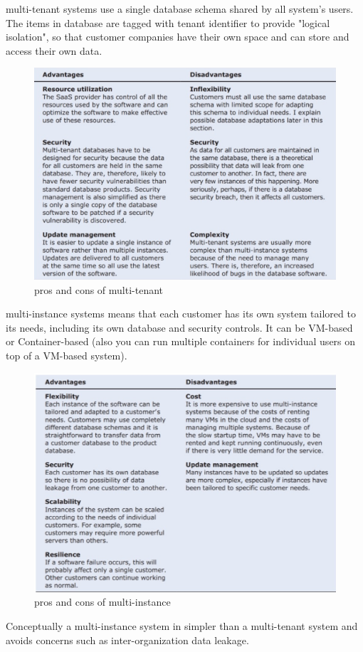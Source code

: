 multi-tenant systems use a single database schema shared by all system's users. The items in database are tagged with tenant identifier to provide "logical isolation", so that customer companies have their
own space and can store and access their own data.
\begin{figure}[ht]
   \centering
   \includegraphics[width=0.5\linewidth]{images/questions/multi-tenant.png}
   \caption{pros and cons of multi-tenant}
   \label{fig:multi-tenant}
\end{figure}
multi-instance systems means that each customer has its own system tailored to its needs, including its own database and security controls. It can be VM-based or Container-based (also you can run multiple containers for individual users on top of a VM-based system).
\begin{figure}[ht]
   \centering
   \includegraphics[width=0.5\linewidth]{images/questions/multi-instance.png}
   \caption{pros and cons of multi-instance}
   \label{fig:multi-instance}
\end{figure}
Conceptually a multi-instance system in simpler than a multi-tenant system and avoids concerns such as inter-organization data leakage.

